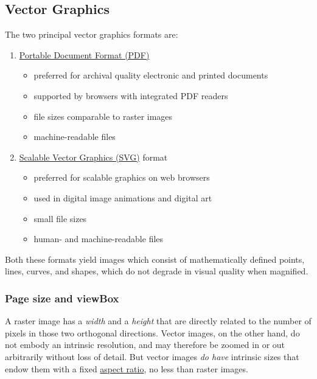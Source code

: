 \documentclass[
  11pt,
  british,
  a4paper,
]{article}
\providecommand{\tightlist}{%
  \setlength{\itemsep}{0pt}\setlength{\parskip}{0pt}}
\begin{document}
\hypertarget{vector-graphics}{%
\subsection{Vector Graphics}\label{vector-graphics}}

The two principal vector graphics formats are:

\begin{enumerate}
\tightlist
\item
  \href{https://en.wikipedia.org/wiki/PDF}{Portable Document Format
  (PDF)}

  \begin{itemize}
  \tightlist
  \item
    preferred for archival quality electronic and printed documents
  \item
    supported by browsers with integrated PDF readers
  \item
    file sizes comparable to raster images
  \item
    machine-readable files
  \end{itemize}
\item
  \href{https://en.wikipedia.org/wiki/Scalable_Vector_Graphics}{Scalable
  Vector Graphics (SVG)} format

  \begin{itemize}
  \tightlist
  \item
    preferred for scalable graphics on web browsers
  \item
    used in digital image animations and digital art
  \item
    small file sizes
  \item
    human- and machine-readable files
  \end{itemize}
\end{enumerate}

Both these formats yield images which consist of mathematically defined
points, lines, curves, and shapes, which do not degrade in visual
quality when magnified.

\hypertarget{page-size-and-viewbox}{%
\subsubsection{Page size and viewBox}\label{page-size-and-viewbox}}

A raster image has a \emph{width} and a \emph{height} that are directly
related to the number of pixels in those two orthogonal directions.
Vector images, on the other hand, do not embody an intrinsic resolution,
and may therefore be zoomed in or out arbitrarily without loss of
detail. But vector images \emph{do have} intrinsic sizes that endow them
with a fixed \href{https://en.wikipedia.org/wiki/Aspect_ratio}{aspect
ratio}, no less than raster images.
\end{document}
